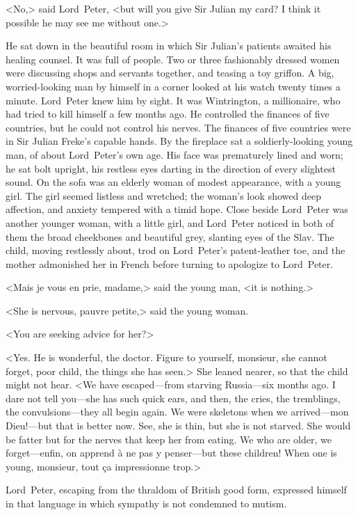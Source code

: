 <No,> said Lord~Peter, <but will you give Sir Julian my card? I think it possible he may see me without one.>

He sat down in the beautiful room in which Sir Julian's patients awaited his healing counsel. It was full of people. Two or three fashionably dressed women were discussing shops and servants together, and teasing a toy griffon. A big, worried-looking man by himself in a corner looked at his watch twenty times a minute. Lord~Peter knew him by sight. It was Wintrington, a millionaire, who had tried to kill himself a few months ago. He controlled the finances of five countries, but he could not control his nerves. The finances of five countries were in Sir Julian Freke's capable hands. By the fireplace sat a soldierly-looking young man, of about Lord~Peter's own age. His face was prematurely lined and worn; he sat bolt upright, his restless eyes darting in the direction of every slightest sound. On the sofa was an elderly woman of modest appearance, with a young girl. The girl seemed listless and wretched; the woman's look showed deep affection, and anxiety tempered with a timid hope. Close beside Lord~Peter was another younger woman, with a little girl, and Lord~Peter noticed in both of them the broad cheekbones and beautiful grey, slanting eyes of the Slav. The child, moving restlessly about, trod on Lord~Peter's patent-leather toe, and the mother admonished her in French before turning to apologize to Lord~Peter.

<Mais je vous en prie, madame,> said the young man, <it is nothing.>

<She is nervous, pauvre petite,> said the young woman.

<You are seeking advice for her?>

<Yes. He is wonderful, the doctor. Figure to yourself, monsieur, she cannot forget, poor child, the things she has seen.> She leaned nearer, so that the child might not hear. <We have escaped—from starving Russia—six months ago. I dare not tell you—she has such quick ears, and then, the cries, the tremblings, the convulsions—they all begin again. We were skeletons when we arrived—mon Dieu!—but that is better now. See, she is thin, but she is not starved. She would be fatter but for the nerves that keep her from eating. We who are older, we forget—enfin, on apprend à ne pas y penser—but these children! When one is young, monsieur, tout ça impressionne trop.>

Lord~Peter, escaping from the thraldom of British good form, expressed himself in that language in which sympathy is not condemned to mutism.

